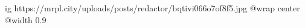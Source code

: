  
 
 
 
 

\ifcmt
  ig https://mrpl.city/uploads/posts/redactor/bqtivi066o7of8f5.jpg
  @wrap center
  @width 0.9
\fi

